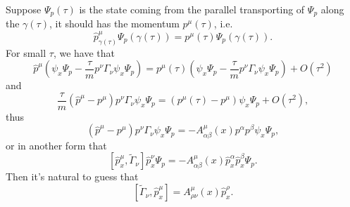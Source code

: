 \documentclass[12pt]{extarticle}
\theoremstyle{definition}
\theoremstyle{plain}
\begin{document}
Suppose $\Psi_{p}(\tau)$ is the state coming from the parallel transporting of $\Psi_{p}$ along the $\gamma(\tau)$, it should has the momentum $p^\mu(\tau)$, i.e.
\[
	\hat p^\mu_{\gamma(\tau)}\Psi_p(\gamma(\tau))=p^\mu(\tau)\Psi_p(\gamma(\tau)).
\]
For small $\tau$, we have that
\[
	\hat p^\mu
	\left(
		\psi_{x}\Psi_p-\frac \tau m p^\nu\Gamma_{\nu}\psi_{x}\Psi_p
	\right)
	=p^\mu(\tau)
	\left(
		\psi_{x}\Psi_p-\frac \tau m p^\nu\Gamma_{\nu}\psi_{x}\Psi_p
	\right)
	+O(\tau^2)
\]
and
\[
	\frac \tau m (\hat p^\mu-p^\mu )p^\nu\Gamma_{\nu}\psi_{x}\Psi_p=(p^\mu(\tau)-p^\mu )\psi_{x}\Psi_p+O(\tau^2),
\]
thus
\[
	(\hat p^\mu-p^\mu )p^\nu\Gamma_{\nu}\psi_{x}\Psi_p=-A^\mu_{\alpha\beta}(x)p^\alpha p^\beta \psi_{x}\Psi_p,
\]
or in another form that
\[
	[\hat p^\mu_x,\widetilde{\Gamma}_{\nu}]\hat p^\nu_x\Psi_p=-A^\mu_{\alpha\beta}(x)\hat p_x^\alpha \hat p_x^\beta \Psi_p.
\]
Then it's natural to guess that
\[
	[\widetilde{\Gamma}_{\nu},\hat p^\mu_x]=A^\mu_{\rho\nu}(x)\hat p_x^\rho.
\]
\end{document}
